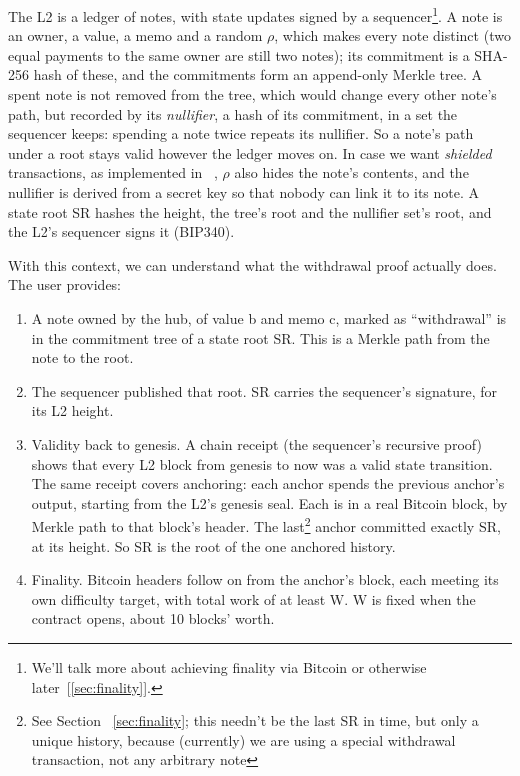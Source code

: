 \documentclass[11pt]{article}
\begin{document}
The L2 is a ledger of notes, with state updates signed by a sequencer\footnote{We'll talk more about achieving finality via Bitcoin or otherwise later~[\ref{sec:finality}].}. A note is an owner, a value, a memo and a
random $\rho$, which makes every note distinct (two equal payments to the
same owner are still two notes); its commitment is a SHA-256 hash of
these, and the commitments form an append-only Merkle tree. A spent note
is not removed from the tree, which would change every other note's
path, but recorded by its \emph{nullifier}, a hash of its commitment, in
a set the sequencer keeps: spending a note twice repeats its nullifier.
So a note's path under a root stays valid however the ledger moves on.
In case we want \emph{shielded} transactions, as implemented in ~\cite{lichencode}, $\rho$
also hides the note's contents, and the nullifier is derived from a
secret key so that nobody can link it to its note. A
state root SR hashes the height, the tree's root and the nullifier
set's root, and the L2's sequencer signs it (BIP340). 

With this context, we can understand what the withdrawal proof actually does. The user provides:

\begin{enumerate}
\item A note owned by the hub, of value b and memo c, marked as ``withdrawal'' is in the commitment tree of a state root SR. This is a Merkle path from the note to the root.

\item The sequencer published that root. SR carries the sequencer's signature, for its L2 height.
\item Validity back to genesis. A chain receipt (the sequencer's recursive proof) shows that every L2 block from genesis to now was a valid state transition. The same receipt covers anchoring: each anchor spends the previous anchor's output, starting from the L2's genesis seal. Each is in a real Bitcoin block, by Merkle path to that block's header. The last\footnote{See Section ~\ref{sec:finality}; this needn't be the last SR in time, but only a unique history, because (currently) we are using a special withdrawal transaction, not any arbitrary note} anchor committed exactly SR, at its height. So SR is the root of the one anchored history.
\item Finality. Bitcoin headers follow on from the anchor's block, each meeting its own difficulty target, with total work of at least W. W is fixed when the contract opens, about 10 blocks' worth.
\end{enumerate}
\end{document}
